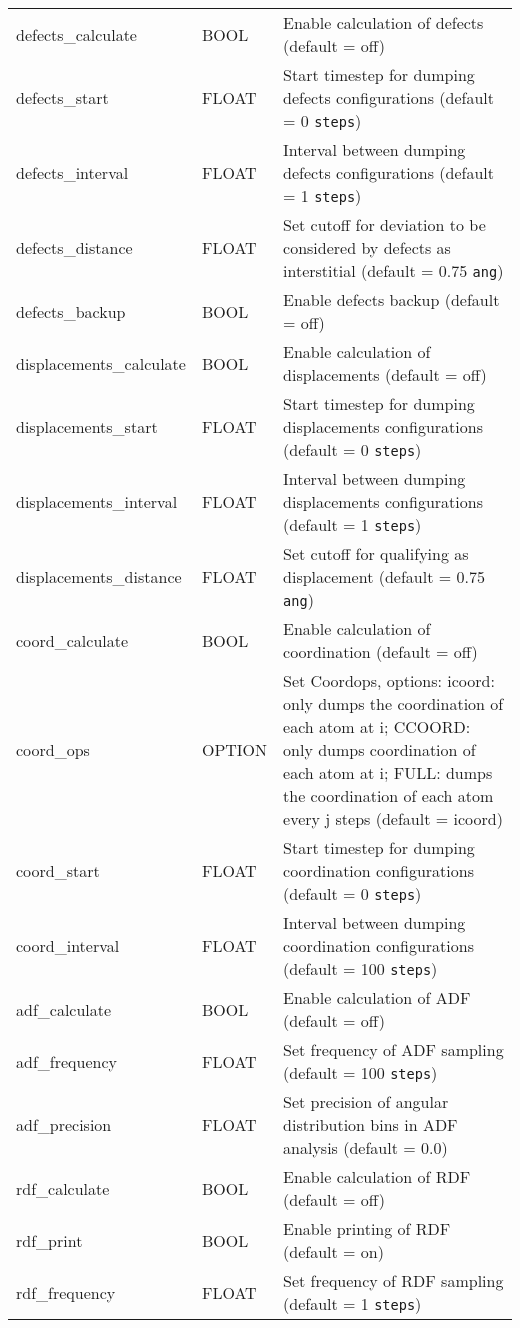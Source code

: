 \begin{longtable}{l l p{10cm}}
defects\_calculate & BOOL & Enable calculation of defects (default = off) \\
defects\_start & FLOAT & Start timestep for dumping defects configurations (default = 0 \verb#steps#) \\
defects\_interval & FLOAT & Interval between dumping defects configurations (default = 1 \verb#steps#) \\
defects\_distance & FLOAT & Set cutoff for deviation to be considered by defects as interstitial (default = 0.75 \verb#ang#) \\
defects\_backup & BOOL & Enable defects backup (default = off) \\
displacements\_calculate & BOOL & Enable calculation of displacements (default = off) \\
displacements\_start & FLOAT & Start timestep for dumping displacements configurations (default = 0 \verb#steps#) \\
displacements\_interval & FLOAT & Interval between dumping displacements configurations (default = 1 \verb#steps#) \\
displacements\_distance & FLOAT & Set cutoff for qualifying as displacement (default = 0.75 \verb#ang#) \\
coord\_calculate & BOOL & Enable calculation of coordination (default = off) \\
coord\_ops & OPTION & Set Coordops, options: icoord: only dumps the coordination of each atom at i; CCOORD: only dumps coordination of each atom at i; FULL: dumps the coordination of each atom every j steps (default = icoord) \\
coord\_start & FLOAT & Start timestep for dumping coordination configurations (default = 0 \verb#steps#) \\
coord\_interval & FLOAT & Interval between dumping coordination configurations (default = 100 \verb#steps#) \\
adf\_calculate & BOOL & Enable calculation of ADF (default = off) \\
adf\_frequency & FLOAT & Set frequency of ADF sampling (default = 100 \verb#steps#) \\
adf\_precision & FLOAT & Set precision of angular distribution bins in ADF analysis (default = 0.0) \\
rdf\_calculate & BOOL & Enable calculation of RDF (default = off) \\
rdf\_print & BOOL & Enable printing of RDF (default = on) \\
rdf\_frequency & FLOAT & Set frequency of RDF sampling (default = 1 \verb#steps#) \\

\end{longtable}

